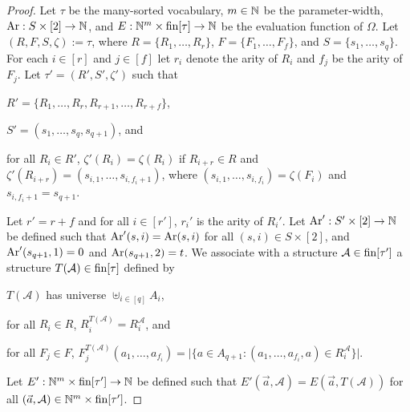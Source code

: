 \documentclass[../main/thesis.tex]{subfiles}
\begin{document}
\begin{proof}
  Let $\tau$ be the many-sorted vocabulary, $m \in \mathbb{N}$ be the
  parameter-width, $\text{\upshape Ar}: S \times [2] \rightarrow \mathbb{N}$, and $E : \mathbb{N}^m \times
  \text{\upshape fin}[\tau] \rightarrow \mathbb{N}$ be the evaluation function of $\Omega$. Let $(R, F, S,
  \zeta):= \tau$, where $R = \{R_1, \ldots, R_{r}\}$, $F = \{ F_1, \ldots, F_{f}
  \}$, and $S = \{s_1, \ldots, s_{q}\}$. For each $i \in [r]$ and $j \in [f]$
  let $r_i$ denote the arity of $R_i$ and $f_j$ be the arity of $F_j$. Let
  $\tau' = (R', S', \zeta')$ such that
  \begin{myitemize}
  \item $R' = \{R_1, \ldots, R_r, R_{r+1}, \ldots, R_{r+f}\}$,
  \item $S' = (s_1, \ldots, s_q, s_{q+1})$, and
  \item for all $R_i \in R'$, $\zeta' (R_i) = \zeta(R_i)$ if $R_{i+r} \in R$ and
    $\zeta'(R_{i+r}) = (s_{i, 1}, \ldots, s_{i, f_i + 1})$, where $(s_{i, 1},
    \ldots, s_{i, f_i}) = \zeta(F_{i})$ and $s_{i, f_i+1} = s_{q+1}$.
  \end{myitemize}
  Let $r' = r + f$ and for all $i \in [r']$, $r_i'$ is the arity of $R_i'$. Let
  $\text{\upshape Ar}' : S' \times [2] \rightarrow \mathbb{N}$ be defined such that $\text{\upshape Ar}'(s, i) = \text{\upshape Ar}(s,i)$
  for all $(s, i) \in S \times [2]$, and $\text{\upshape Ar}'(s_{q+1}, 1) = 0$ and
  $\text{\upshape Ar}(s_{q+1}, 2) = t$. We associate with a structure $\mathcal{A} \in
  \text{\upshape fin}[\tau']$ a structure $T(\mathcal{A}) \in \text{\upshape fin}[\tau]$ defined by
  \begin{myitemize}
  \item $T(\mathcal{A})$ has universe $\uplus_{i \in [q]}A_i$,
  \item for all $R_i \in R$, $R^{T(\mathcal{A})}_i = R^{\mathcal{A}}_i$, and
  \item for all $F_j \in F$, $F^{T(\mathcal{A})}_j(a_1, \ldots, a_{f_i}) = \vert
    \{ a \in A_{q+1}: (a_1, \ldots, a_{f_i}, a) \in R^{\mathcal{A}}_i\} \vert$.
  \end{myitemize}
  Let $E': \mathbb{N}^m \times \text{\upshape fin}[\tau'] \rightarrow \mathbb{N}$ be defined such that
  $E'(\vec{a}, \mathcal{A}) = E(\vec{a}, T(\mathcal{A}))$ for all $(\vec{a},
  \mathcal{A}) \in \mathbb{N}^m \times \text{\upshape fin}[\tau']$.


\end{proof}
\end{document}
